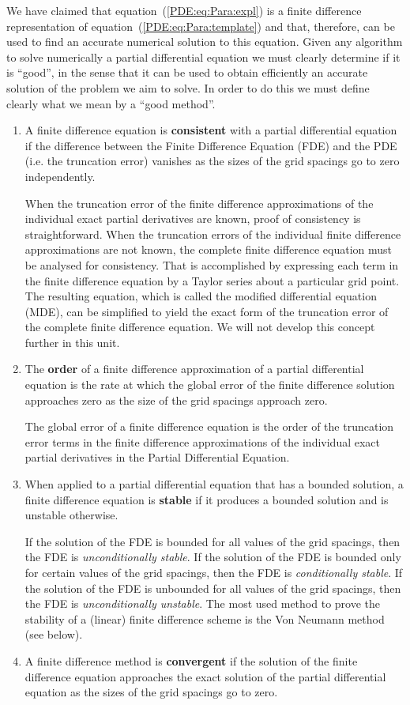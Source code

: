 We have claimed that equation~(\ref{PDE:eq:Para:expl}) is a finite
difference representation of equation~(\ref{PDE:eq:Para:template}) and
that, therefore, can be used to find an accurate numerical solution to
this equation.  Given any algorithm to solve numerically a partial
differential equation we must clearly determine if it is ``good'', in
the sense that it can be used to obtain efficiently an accurate
solution of the problem we aim to solve.  In order to do this we must
define clearly what we mean by a ``good method''.

\begin{enumerate}
\item A finite difference equation is \textbf{consistent} with a
  partial differential equation if the difference between the Finite
  Difference Equation (FDE) and the PDE (i.e. the truncation error)
  vanishes as the sizes of the grid spacings go to zero independently.

  When the truncation error of the finite difference approximations of
  the individual exact partial derivatives are known, proof of
  consistency is straightforward. When the truncation errors of the
  individual finite difference approximations are not known, the
  complete finite difference equation must be analysed for
  consistency.  That is accomplished by expressing each term in the
  finite difference equation by a Taylor series about a particular
  grid point.  The resulting equation, which is called the modified
  differential equation (MDE), can be simplified to yield the exact
  form of the truncation error of the complete finite difference
  equation.  We will not develop this concept further in this unit.
\item The \textbf{order} of a finite difference approximation of a
  partial differential equation is the rate at which the global error
  of the finite difference solution approaches zero as the size of the
  grid spacings approach zero.

  The global error of a finite difference equation is the order of the
  truncation error terms in the finite difference approximations of
  the individual exact partial derivatives in the Partial Differential
  Equation.
\item When applied to a partial differential equation that has a
  bounded solution, a finite difference equation is \textbf{stable} if
  it produces a bounded solution and is unstable otherwise.

  If the solution of the FDE is bounded for all values of the grid
  spacings, then the FDE is \textit{unconditionally stable}.  If the
  solution of the FDE is bounded only for certain values of the grid
  spacings, then the FDE is \textit{conditionally stable}.  If the
  solution of the FDE is unbounded for all values of the grid
  spacings, then the FDE is \textit{unconditionally unstable}.  The
  most used method to prove the stability of a (linear) finite
  difference scheme is the Von Neumann method (see below).
\item A finite difference method is \textbf{convergent} if the
  solution of the finite difference equation approaches the exact
  solution of the partial differential equation as the sizes of the
  grid spacings go to zero.


\end{enumerate}
